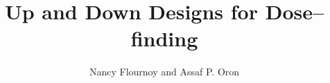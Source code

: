 \documentclass{book}
\begin{document}
\title{Up and Down Designs for Dose--finding}
\author{Nancy Flournoy and Assaf P. Oron}

\begin{doublespace}
\maketitle
\frontmatter
\tableofcontents
\mainmatter
{}

\setcounter{chapter}{24}

\maketitle




\end{doublespace}

\begin{center}
%


\end{center}
\end{document}
